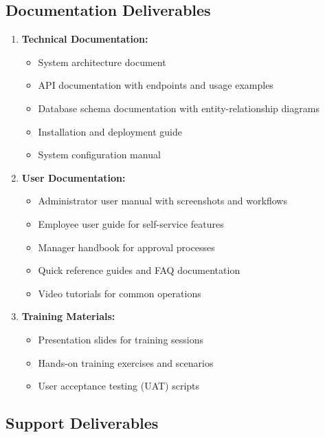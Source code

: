 \documentclass[12pt]{article}
\begin{document}
\subsection{Documentation Deliverables}

\begin{enumerate}
\item \textbf{Technical Documentation:}
   \begin{itemize}[noitemsep]
   \item System architecture document
   \item API documentation with endpoints and usage examples
   \item Database schema documentation with entity-relationship diagrams
   \item Installation and deployment guide
   \item System configuration manual
   \end{itemize}

\item \textbf{User Documentation:}
   \begin{itemize}[noitemsep]
   \item Administrator user manual with screenshots and workflows
   \item Employee user guide for self-service features
   \item Manager handbook for approval processes
   \item Quick reference guides and FAQ documentation
   \item Video tutorials for common operations
   \end{itemize}

\item \textbf{Training Materials:}
   \begin{itemize}[noitemsep]
   \item Presentation slides for training sessions
   \item Hands-on training exercises and scenarios
   \item User acceptance testing (UAT) scripts
   \end{itemize}
\end{enumerate}

\subsection{Support Deliverables}
\end{document}
